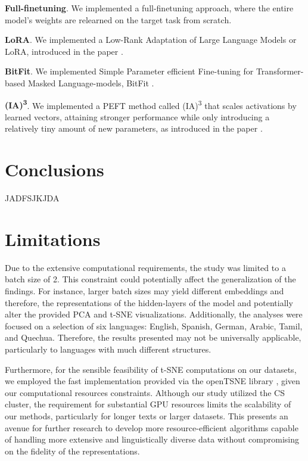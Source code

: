 \documentclass[11pt]{article}
\newcommand{\customsection}[1]{
  \noindent\textbf{#1}.\vspace{2mm}
}
\begin{document}
\customsection{Full-finetuning} We implemented a full-finetuning approach, where the entire model's weights are relearned on the target task from scratch.

\customsection{LoRA} We implemented a Low-Rank Adaptation of Large Language Models or LoRA, introduced in the paper \cite{hu2021lora}.

\customsection{BitFit} We implemented Simple Parameter efficient Fine-tuning
for Transformer-based Masked Language-models, BitFit \cite{zaken2022bitfit}.

\customsection{(IA)\textsuperscript{3}} We implemented a PEFT method called (IA)\textsuperscript{3} that scales activations by learned vectors, attaining stronger performance while only introducing a relatively tiny amount of new parameters, as introduced in the paper \cite{liu2022fewshot}.

\section{Conclusions}

JADFSJKJDA

\section*{Limitations}
Due to the extensive computational requirements, the study was limited to a batch size of 2. This constraint could potentially affect the generalization of the findings. For instance, larger batch sizes may yield different embeddings and therefore, the representations of the hidden-layers of the model and potentially alter the provided PCA and t-SNE visualizations. Additionally, the analyses were focused on a selection of six languages: English, Spanish, German, Arabic, Tamil, and Quechua. Therefore, the results presented may not be universally applicable, particularly to languages with much different structures.

Furthermore, for the sensible feasibility of t-SNE computations on our datasets, we employed the fast implementation provided via the openTSNE library \cite{opentsne}, given our computational resources constraints. Although our study utilized the CS cluster, the requirement for substantial GPU resources limits the scalability of our methods, particularly for longer texts or larger datasets. This presents an avenue for further research to develop more resource-efficient algorithms capable of handling more extensive and linguistically diverse data without compromising on the fidelity of the representations.
\end{document}
